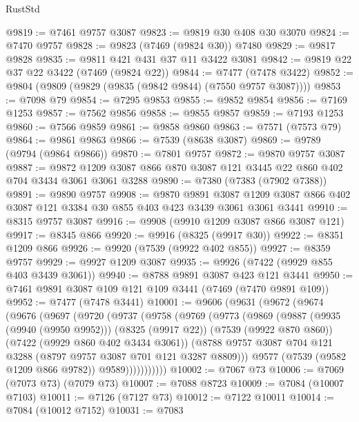 \begin{lexlean}{RustStd}
\begin{coremodule}
@9819 := @7461 @9757 @3087
@9823 := @9819 @30 @408 @30 @3070
@9824 := @7470 @9757
@9828 := @9823 (@7469 (@9824 @30)) @7480
@9829 := @9817 @9828
@9835 := @9811 @421 @431 @37 @11 @3422 @3081
@9842 := @9819 @22 @37 @22 @3422 (@7469 (@9824 @22))
@9844 := @7477 (@7478 @3422)
@9852 := @9804 (@9809 (@9829 (@9835 (@9842 @9844) (@7550 @9757 @3087))))
@9853 := @7098 @79
@9854 := @7295 @9853
@9855 := @9852 @9854
@9856 := @7169 @1253
@9857 := @7562 @9856
@9858 := @9855 @9857
@9859 := @7193 @1253
@9860 := @7566 @9859
@9861 := @9858 @9860
@9863 := @7571 (@7573 @79)
@9864 := @9861 @9863
@9866 := @7539 (@8638 @3087)
@9869 := @9789 (@9794 (@9864 @9866))
@9870 := @7801 @9757
@9872 := @9870 @9757 @3087
@9887 := @9872 @1209 @3087 @866 @870 @3087 @121 @3445 @22 @860 @402 @704 @3434 @3061 @3061 @3288
@9890 := @7380 (@7383 (@7902 @7388))
@9891 := @9890 @9757
@9908 := @9870
    @9891
    @3087
    @1209
    @3087
    @866
    @402
    @3087
    @121
    @3384
    @30
    @855
    @403
    @423
    @3439
    @3061
    @3061
    @3441
@9910 := @8315 @9757 @3087
@9916 := @9908 (@9910 @1209 @3087 @866 @3087 @121)
@9917 := @8345 @866
@9920 := @9916 (@8325 (@9917 @30))
@9922 := @8351 @1209 @866
@9926 := @9920 (@7539 (@9922 @402 @855))
@9927 := @8359 @9757
@9929 := @9927 @1209 @3087
@9935 := @9926 (@7422 (@9929 @855 @403 @3439 @3061))
@9940 := @8788 @9891 @3087 @423 @121 @3441
@9950 := @7461 @9891 @3087 @109 @121 @109 @3441 (@7469 (@7470 @9891 @109))
@9952 := @7477 (@7478 @3441)
@10001 := @9606
    (@9631
      (@9672
        (@9674
          (@9676
            (@9697
              (@9720
                (@9737
                  (@9758
                    (@9769
                      (@9773
                        (@9869
                          (@9887
                            (@9935 (@9940 (@9950 @9952)))
                            (@8325 (@9917 @22))
                            (@7539 (@9922 @870 @860))
                            (@7422 (@9929 @860 @402 @3434 @3061))
                            (@8788
                              @9757
                              @3087
                              @704
                              @121
                              @3288
                              (@8797 @9757 @3087 @701 @121 @3287 @8809)))
                          @9577
                          (@7539 (@9582 @1209 @866 @9782))
                          @9589)))))))))))
@10002 := @7067 @73
@10006 := @7069 (@7073 @73) (@7079 @73)
@10007 := @7088 @8723
@10009 := @7084 (@10007 @7103)
@10011 := @7126 (@7127 @73)
@10012 := @7122 @10011
@10014 := @7084 (@10012 @7152)
@10031 := @7083

\end{coremodule}
\end{lexlean}
